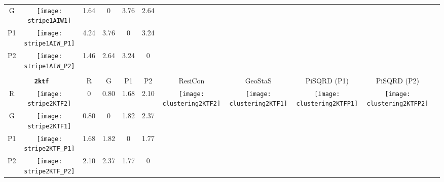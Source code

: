 \documentclass[a4paper,11pt,twoside]{book}%
\begin{document}
\begin{appendices}
\begin{sidewaystable}[h!]
\begin{tabular*}{4cm}{cc|c|c|c|c|c|c|c|c|c|}
\cline{1-6}
\multicolumn{1}{|c|}{G} & \texttt{[image: stripe1AIW1]} & 1.64 & 0 & 3.76 & 2.64 & \multirow{4}{*}{} & \multirow{4}{*}{} & \multirow{4}{*}{} & \multirow{4}{*}{} & \multirow{5}{*}{} \\
\cline{1-6}
\multicolumn{1}{|c|}{P1} & \texttt{[image: stripe1AIW\_P1]} & 4.24 & 3.76 & 0 & 3.24 & \multirow{4}{*}{} & \multirow{4}{*}{} & \multirow{4}{*}{} & \multirow{4}{*}{} & \multirow{5}{*}{}  \\
\cline{1-6}
\multicolumn{1}{|c|}{P2} & \texttt{[image: stripe1AIW\_P2]} & 1.46 & 2.64 & 3.24 & 0 & \multirow{4}{*}{} & \multirow{4}{*}{} & \multirow{4}{*}{} & \multirow{4}{*}{} & \multirow{5}{*}{}  \\
\cline{1-11}
\\
\cline{1-11}
\multicolumn{2}{|c|}{{\bf \texttt{2ktf}}} & R & G & P1 & P2 & ResiCon & GeoStaS & PiSQRD (P1) & PiSQRD (P2) & \multirow{5}{*}{\vspace{-0.15cm}\texttt{[image: threeHistogram2KTF]}}  \\
\cline{1-10}
\multicolumn{1}{|c|}{R} & \texttt{[image: stripe2KTF2]} & 0 & 0.80 & 1.68 & 2.10 & \multirow{4}{*}{\vspace{-0.3cm}\texttt{[image: clustering2KTF2]}} & \multirow{4}{*}{\vspace{-0.3cm}\texttt{[image: clustering2KTF1]}} & \multirow{4}{*}{\vspace{-0.3cm}\texttt{[image: clustering2KTFP1]}} & \multirow{4}{*}{\vspace{-0.3cm}\texttt{[image: clustering2KTFP2]}} &  \multirow{5}{*}{} \\
\cline{1-6}
\multicolumn{1}{|c|}{G} & \texttt{[image: stripe2KTF1]} & 0.80 & 0 & 1.82 & 2.37 & \multirow{4}{*}{} & \multirow{4}{*}{} & \multirow{4}{*}{} & \multirow{4}{*}{} & \multirow{5}{*}{} \\
\cline{1-6}
\multicolumn{1}{|c|}{P1} & \texttt{[image: stripe2KTF\_P1]} & 1.68 & 1.82 & 0 & 1.77 & \multirow{4}{*}{} & \multirow{4}{*}{} & \multirow{4}{*}{} & \multirow{4}{*}{} & \multirow{5}{*}{}  \\
\cline{1-6}
\multicolumn{1}{|c|}{P2} & \texttt{[image: stripe2KTF\_P2]} & 2.10 & 2.37 & 1.77 & 0 & \multirow{4}{*}{} & \multirow{4}{*}{} & \multirow{4}{*}{} & \multirow{4}{*}{} & \multirow{5}{*}{}  \\
\cline{1-11}
\end{tabular*}
\normalfont
\end{sidewaystable}




\end{appendices}
\end{document}
